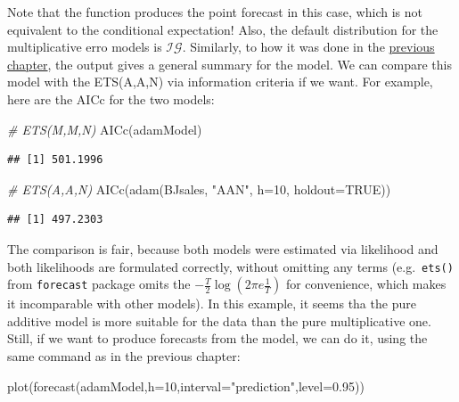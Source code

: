 \documentclass[
]{book}
\newenvironment{Shaded}{\begin{snugshade}}{\end{snugshade}}
\newcommand{\AttributeTok}[1]{\textcolor[rgb]{0.77,0.63,0.00}{#1}}
\newcommand{\CommentTok}[1]{\textcolor[rgb]{0.56,0.35,0.01}{\textit{#1}}}
\newcommand{\ConstantTok}[1]{\textcolor[rgb]{0.00,0.00,0.00}{#1}}
\newcommand{\DecValTok}[1]{\textcolor[rgb]{0.00,0.00,0.81}{#1}}
\newcommand{\FloatTok}[1]{\textcolor[rgb]{0.00,0.00,0.81}{#1}}
\newcommand{\FunctionTok}[1]{\textcolor[rgb]{0.00,0.00,0.00}{#1}}
\newcommand{\NormalTok}[1]{#1}
\newcommand{\StringTok}[1]{\textcolor[rgb]{0.31,0.60,0.02}{#1}}
\theoremstyle{definition}
\theoremstyle{definition}
\theoremstyle{definition}
\theoremstyle{definition}
\theoremstyle{remark}
\begin{document}
Note that the function produces the point forecast in this case, which is not equivalent to the conditional expectation! Also, the default distribution for the multiplicative erro models is \(\mathcal{IG}\). Similarly, to how it was done in the \protect\hyperlink{ADAMETSPureAdditiveExamples}{previous chapter}, the output gives a general summary for the model. We can compare this model with the ETS(A,A,N) via information criteria if we want. For example, here are the AICc for the two models:

\begin{Shaded}
\begin{Highlighting}[]
\CommentTok{\# ETS(M,M,N)}
\FunctionTok{AICc}\NormalTok{(adamModel)}
\end{Highlighting}
\end{Shaded}

\begin{verbatim}
## [1] 501.1996
\end{verbatim}

\begin{Shaded}
\begin{Highlighting}[]
\CommentTok{\# ETS(A,A,N)}
\FunctionTok{AICc}\NormalTok{(}\FunctionTok{adam}\NormalTok{(BJsales, }\StringTok{"AAN"}\NormalTok{, }\AttributeTok{h=}\DecValTok{10}\NormalTok{, }\AttributeTok{holdout=}\ConstantTok{TRUE}\NormalTok{))}
\end{Highlighting}
\end{Shaded}

\begin{verbatim}
## [1] 497.2303
\end{verbatim}

The comparison is fair, because both models were estimated via likelihood and both likelihoods are formulated correctly, without omitting any terms (e.g.~\texttt{ets()} from \texttt{forecast} package omits the \(-\frac{T}{2} \log\left(2\pi e \frac{1}{T}\right)\) for convenience, which makes it incomparable with other models). In this example, it seems tha the pure additive model is more suitable for the data than the pure multiplicative one. Still, if we want to produce forecasts from the model, we can do it, using the same command as in the previous chapter:

\begin{Shaded}
\begin{Highlighting}[]
\FunctionTok{plot}\NormalTok{(}\FunctionTok{forecast}\NormalTok{(adamModel,}\AttributeTok{h=}\DecValTok{10}\NormalTok{,}\AttributeTok{interval=}\StringTok{"prediction"}\NormalTok{,}\AttributeTok{level=}\FloatTok{0.95}\NormalTok{))}
\end{Highlighting}
\end{Shaded}
\end{document}
